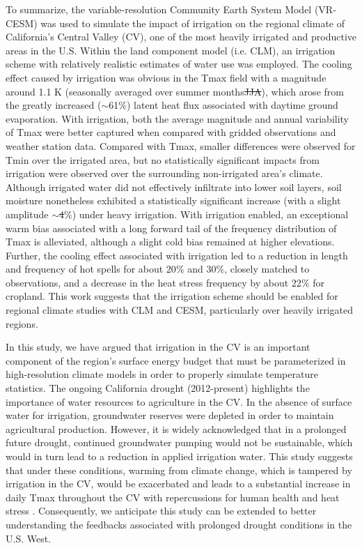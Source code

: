 \documentclass[draft,ms]{agutex}   %
\providecommand{\DIFadd}[1]{{\protect\color{blue}\uwave{#1}}} %
\providecommand{\DIFdel}[1]{{\protect\color{red}\sout{#1}}}                      %
\providecommand{\DIFaddbegin}{} %
\providecommand{\DIFaddend}{} %
\providecommand{\DIFdelbegin}{} %
\providecommand{\DIFdelend}{} %
\begin{document}
\begin{article}
To summarize, the variable-resolution Community Earth System Model (VR-CESM) was used to simulate the impact of irrigation on the regional climate of California's Central Valley (CV), one of the most heavily irrigated and productive areas in the U.S. Within the land component model (i.e. CLM), an irrigation scheme with relatively realistic estimates of water use was employed. The cooling effect caused by irrigation was obvious in the Tmax field with a magnitude around 1.1 K (seasonally averaged over summer months\DIFdelbegin \DIFdel{JJA}\DIFdelend ), which arose from the greatly increased ($\sim$61$\%$) latent heat flux associated with daytime ground evaporation. With irrigation, both the average magnitude and annual variability of Tmax were better captured when compared with gridded observations and weather station data. Compared with Tmax, smaller differences were observed for Tmin over the irrigated area, but no statistically significant impacts from irrigation were observed over the surrounding non-irrigated area's climate. Although irrigated water did not effectively infiltrate into lower soil layers, soil moisture nonetheless exhibited a statistically significant increase (with a slight amplitude $\sim$\DIFdelbegin \DIFdel{4}\DIFdelend \DIFaddbegin \DIFadd{4.4}\DIFaddend $\%$) under heavy irrigation. With irrigation enabled, an exceptional warm bias associated with a long forward tail of the frequency distribution of Tmax is alleviated, although a slight cold bias remained at higher elevations. Further, the cooling effect associated with irrigation led to a reduction in length and frequency of hot spells for about 20$\%$ and 30$\%$, closely matched to observations, and a decrease in the heat stress frequency by about 22$\%$ for cropland. This work suggests that the irrigation scheme should be enabled for regional climate studies with CLM and CESM, particularly over heavily irrigated regions.

In this study, we have argued that irrigation in the CV is an important component of the region's surface energy budget that must be parameterized in high-resolution climate models in order to properly simulate temperature statistics. The ongoing California drought (2012-present) highlights the importance of water resources to agriculture in the CV. In the absence of surface water for irrigation, groundwater reserves were depleted in order to maintain agricultural production.  However, it is widely acknowledged that in a prolonged future drought, continued groundwater pumping would not be sustainable, which would in turn lead to a reduction in applied irrigation water.  This study suggests that under these conditions, warming from climate change, which is tampered by irrigation in the CV, would be exacerbated and leads to a substantial increase in daily Tmax throughout the CV with repercussions for human health and heat stress \citep{williams2015contribution}. Consequently, we anticipate this study can be extended to better understanding the feedbacks associated with prolonged drought conditions in the U.S. West.


\end{article}
\end{document}
